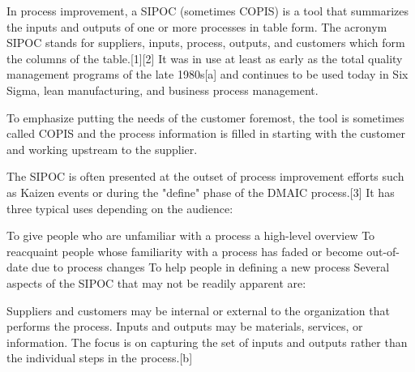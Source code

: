 In process improvement, a SIPOC (sometimes COPIS) is a tool that summarizes the inputs and outputs of one or more processes in table form. The acronym SIPOC stands for suppliers, inputs, process, outputs, and customers which form the columns of the table.[1][2] It was in use at least as early as the total quality management programs of the late 1980s[a] and continues to be used today in Six Sigma, lean manufacturing, and business process management.

To emphasize putting the needs of the customer foremost, the tool is sometimes called COPIS and the process information is filled in starting with the customer and working upstream to the supplier.

The SIPOC is often presented at the outset of process improvement efforts such as Kaizen events or during the "define" phase of the DMAIC process.[3] It has three typical uses depending on the audience:

To give people who are unfamiliar with a process a high-level overview
To reacquaint people whose familiarity with a process has faded or become out-of-date due to process changes
To help people in defining a new process
Several aspects of the SIPOC that may not be readily apparent are:

Suppliers and customers may be internal or external to the organization that performs the process.
Inputs and outputs may be materials, services, or information.
The focus is on capturing the set of inputs and outputs rather than the individual steps in the process.[b]
